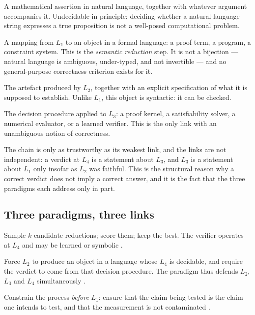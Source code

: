 \documentclass[11pt,a4paper]{article}
\newcommand{\paradigmV}{\textsf{V}}
\newcommand{\paradigmF}{\textsf{F}}
\newcommand{\paradigmR}{\textsf{R}}
\begin{document}
\begin{description}[leftmargin=1.2em,itemsep=3pt]
  \item[$L_1$ --- Informal claim.] A mathematical assertion in natural
  language, together with whatever argument accompanies it. Undecidable in
  principle: deciding whether a natural-language string expresses a true
  proposition is not a well-posed computational problem.

  \item[$L_2$ --- Reduction.] A mapping from $L_1$ to an object in a formal
  language: a proof term, a program, a constraint system. This is the
  \emph{semantic reduction} step. It is not a bijection --- natural language is
  ambiguous, under-typed, and not invertible --- and no general-purpose
  correctness criterion exists for it.

  \item[$L_3$ --- Formal object.] The artefact produced by $L_2$, together with
  an explicit specification of what it is supposed to establish. Unlike $L_1$,
  this object is syntactic: it can be checked.

  \item[$L_4$ --- Verdict.] The decision procedure applied to $L_3$: a proof
  kernel, a satisfiability solver, a numerical evaluator, or a learned verifier.
  This is the only link with an unambiguous notion of correctness.
\end{description}

The chain is only as trustworthy as its weakest link, and the links are not
independent: a verdict at $L_4$ is a statement about $L_3$, and $L_3$ is a
statement about $L_1$ only insofar as $L_2$ was faithful. This is the
structural reason why a correct verdict does not imply a correct answer, and it
is the fact that the three paradigms each address only in part.

\subsection{Three paradigms, three links}

\begin{description}[leftmargin=1.2em,itemsep=3pt]
  \item[\paradigmV{} --- Verifier-in-the-loop.] Sample $k$ candidate
  reductions; score them; keep the best. The verifier operates at $L_4$ and
  may be learned \citep{cobbe2021gsm8k,lightman2024verify} or symbolic
  \citep{kambhampati2024llmmodulo}.

  \item[\paradigmF{} --- Formalization.] Force $L_2$ to produce an object in a
  language whose $L_4$ is decidable, and require the verdict to come from that
  decision procedure. The paradigm thus defends $L_2$, $L_3$ and $L_4$
  simultaneously \citep{wu2022autoformalization,jiang2023dsp,yang2023leandojo}.

  \item[\paradigmR{} --- Reproducible evaluation.] Constrain the process
  \emph{before} $L_1$: ensure that the claim being tested is the claim one
  intends to test, and that the measurement is not contaminated
  \citep{sainz2023contamination,white2024livebench,rein2023gpqa}.
\end{description}
\end{document}
